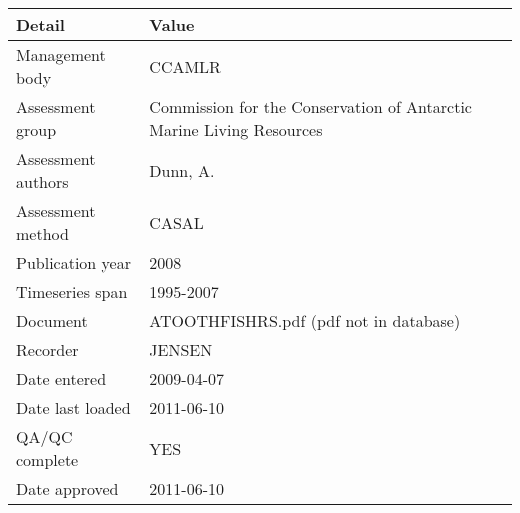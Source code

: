 \begin{table}[htb]
\centering
\begin{tabular}{lp{7cm}}
\toprule
Detail & Value \\
\midrule
Management body    & CCAMLR                                                               \\
Assessment group   & Commission for the Conservation of Antarctic Marine Living Resources \\
Assessment authors & Dunn, A.                                                             \\
Assessment method  & CASAL                                                                \\
Publication year   & 2008                                                                 \\
Timeseries span    & 1995-2007                                                            \\
Document           & ATOOTHFISHRS.pdf (pdf not in database)                               \\
Recorder           & JENSEN                                                               \\
Date entered       & 2009-04-07                                                           \\
Date last loaded   & 2011-06-10                                                           \\
QA/QC complete     & YES                                                                  \\
Date approved      & 2011-06-10                                                           \\
\bottomrule
\end{tabular}
\label{tab:assessdet}
\end{table}
